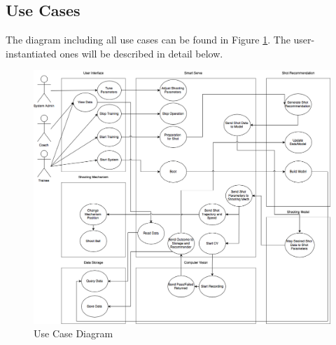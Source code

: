 \documentclass[11pt]{article}
\begin{document}
\subsection{Use Cases}
The diagram including all use cases can be found in Figure \ref{fig:usecase}. The user-instantiated ones will be described in detail below.
\begin{figure}[H]
   \centering
   \includegraphics[width=\textwidth]{img/UseCase.png} %
   \caption{Use Case Diagram}
   \label{fig:usecase}
\end{figure}
\end{document}
